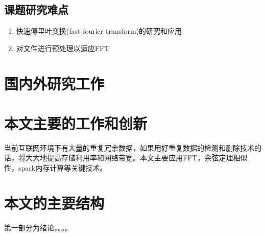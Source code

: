 \subsection{课题研究难点}
\label{sec:point2}

\begin{enumerate}
\item 快速傅里叶变换(fast fourier transform)的研究和应用

\item 对文件进行预处理以适应FFT

\end{enumerate}

\section{国内外研究工作}
\label{sec:relatedwork}

\section{本文主要的工作和创新}
\label{sec:relatedwork}

当前互联网环境下有大量的重复冗余数据，如果用好重复数据的检测和删除技术的话，将大大地提高存储利用率和网络带宽。本文主要应用FFT，余弦定理相似性，spark内存计算等关键技术。

\section{本文的主要结构}
\label{sec:cons}

第一部分为绪论，。。。
